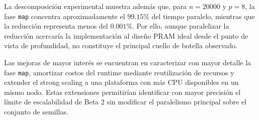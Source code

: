 \documentclass[11pt,a4paper]{article}
\begin{document}
La descomposición experimental muestra además que, para $n=20000$ y $p=8$,
la fase \texttt{map} concentra aproximadamente el $99.15\%$ del tiempo paralelo,
mientras que la reducción representa menos del $0.001\%$. Por ello, aunque
paralelizar la reducción acercaría la implementación al diseño PRAM ideal desde
el punto de vista de profundidad, no constituye el principal cuello de botella
observado.

Las mejoras de mayor interés se encuentran en caracterizar con mayor detalle la
fase \texttt{map}, amortizar costos del runtime mediante reutilización de recursos
y extender el strong scaling a una plataforma con más CPU disponibles en un mismo
nodo. Estas extensiones permitirían identificar con mayor precisión el límite de
escalabilidad de Beta 2 sin modificar el paralelismo principal sobre el conjunto
de semillas.

\newpage



\end{document}
